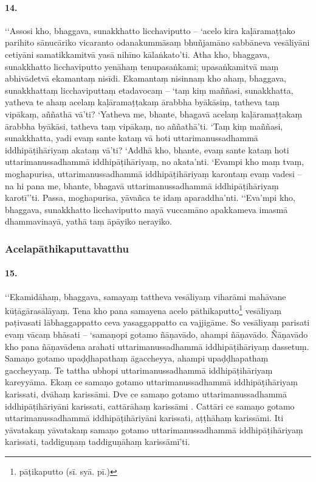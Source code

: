 \paragraph{14.} ‘‘Assosi kho, bhaggava, sunakkhatto licchaviputto – ‘acelo kira kaḷāramaṭṭako parihito sānucāriko vicaranto odanakummāsaṃ bhuñjamāno sabbāneva vesāliyāni cetiyāni samatikkamitvā yasā nihīno kālaṅkato’ti. Atha kho, bhaggava, sunakkhatto licchaviputto yenāhaṃ tenupasaṅkami; upasaṅkamitvā maṃ abhivādetvā ekamantaṃ nisīdi. Ekamantaṃ nisinnaṃ kho ahaṃ, bhaggava, sunakkhattaṃ licchaviputtaṃ etadavocaṃ – ‘taṃ kiṃ maññasi, sunakkhatta, yatheva te ahaṃ acelaṃ kaḷāramaṭṭakaṃ ārabbha byākāsiṃ, tatheva taṃ vipākaṃ, aññathā vā’ti? ‘Yatheva me, bhante, bhagavā acelaṃ kaḷāramaṭṭakaṃ ārabbha byākāsi, tatheva taṃ vipākaṃ, no aññathā’ti. ‘Taṃ kiṃ maññasi, sunakkhatta, yadi evaṃ sante kataṃ vā hoti uttarimanussadhammā iddhipāṭihāriyaṃ akataṃ vā’ti? ‘Addhā kho, bhante, evaṃ sante kataṃ hoti uttarimanussadhammā iddhipāṭihāriyaṃ, no akata’nti. ‘Evampi kho maṃ tvaṃ, moghapurisa, uttarimanussadhammā iddhipāṭihāriyaṃ karontaṃ evaṃ vadesi – na hi pana me, bhante, bhagavā uttarimanussadhammā iddhipāṭihāriyaṃ karotī’’ti. Passa, moghapurisa, yāvañca te idaṃ aparaddha’nti. ‘‘Eva’mpi kho, bhaggava, sunakkhatto licchaviputto mayā vuccamāno apakkameva imasmā dhammavinayā, yathā taṃ āpāyiko nerayiko.

\subsubsection{Acelapāthikaputtavatthu}

\paragraph{15.} ‘‘Ekamidāhaṃ, bhaggava, samayaṃ tattheva vesāliyaṃ viharāmi mahāvane kūṭāgārasālāyaṃ. Tena kho pana samayena acelo pāthikaputto\footnote{pāṭikaputto (sī. syā. pī.)} vesāliyaṃ paṭivasati lābhaggappatto ceva yasaggappatto ca vajjigāme. So vesāliyaṃ parisati evaṃ vācaṃ bhāsati – ‘samaṇopi gotamo ñāṇavādo, ahampi ñāṇavādo. Ñāṇavādo kho pana ñāṇavādena arahati uttarimanussadhammā iddhipāṭihāriyaṃ dassetuṃ. Samaṇo gotamo upaḍḍhapathaṃ āgaccheyya, ahampi upaḍḍhapathaṃ gaccheyyaṃ. Te tattha ubhopi uttarimanussadhammā iddhipāṭihāriyaṃ kareyyāma. Ekaṃ ce samaṇo gotamo uttarimanussadhammā iddhipāṭihāriyaṃ karissati, dvāhaṃ karissāmi. Dve ce samaṇo gotamo uttarimanussadhammā iddhipāṭihāriyāni karissati, cattārāhaṃ karissāmi . Cattāri ce samaṇo gotamo uttarimanussadhammā iddhipāṭihāriyāni karissati, aṭṭhāhaṃ karissāmi. Iti yāvatakaṃ yāvatakaṃ samaṇo gotamo uttarimanussadhammā iddhipāṭihāriyaṃ karissati, taddiguṇaṃ taddiguṇāhaṃ karissāmī’ti.

